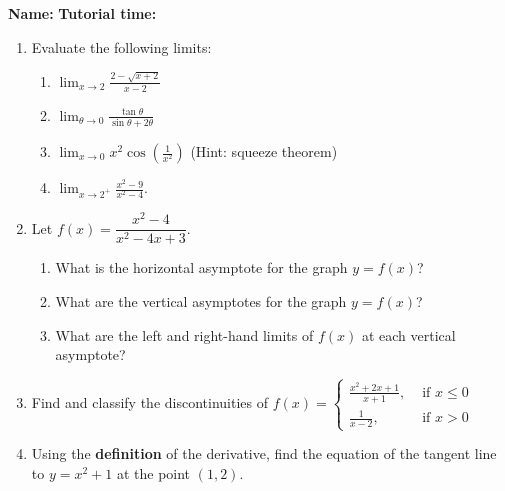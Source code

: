 \documentclass[12pt]{article}
\newcommand{\di}{\displaystyle}
\begin{document}
{\bf \large Name:} \hspace{2.5in} {\bf Tutorial time:}

\bigskip

\bigskip

\thispagestyle{fancy}

 \begin{enumerate}
 \item  Evaluate the following limits:
\begin{enumerate}
 \item $\di \lim_{x\to 2}\frac{2-\sqrt{x+2}}{x-2}$

\vspace{1.5in}

 \item $\di \lim_{\theta\to 0}\frac{\tan\theta}{\sin\theta + 2\theta}$

\vspace{2in}

 \item $\di \lim_{x\to 0}x^2\cos\left(\frac{1}{x^2}\right)$ (Hint: squeeze theorem)

\vspace{2in}

 \item $\di \lim_{x\to 2^+}\frac{x^2-9}{x^2-4}$.
\end{enumerate}

\newpage

 \item Let $f(x) = \dfrac{x^2-4}{x^2-4x+3}$.
\begin{enumerate}
 \item What is the horizontal asymptote for the graph $y=f(x)$?

\vspace{0.5in}

 \item What are the vertical asymptotes for the graph $y=f(x)$?

\vspace{0.5in}

 \item What are the left and right-hand limits of $f(x)$ at each vertical asymptote?

\vspace{1.5in}
\end{enumerate}




\item Find and classify the discontinuities of $\di f(x) = \begin{cases} \frac{x^2+2x+1}{x+1}, & \text{ if } x \leq 0\\ \frac{1}{x-2}, & \text{ if } x>0\end{cases}$

\vspace{2in}

\item Using the \textbf{definition} of the derivative, find the equation of the tangent line to $y=x^2+1$ at the point $(1,2)$.
 \end{enumerate}
\end{document}
